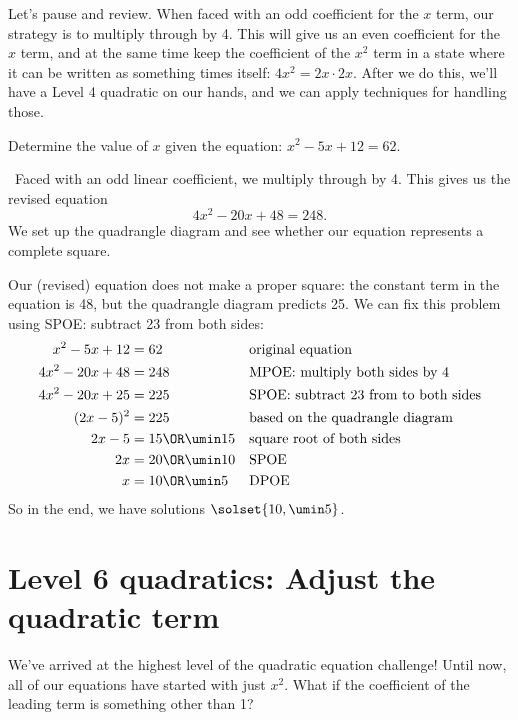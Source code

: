 Let's pause and review. When faced with an odd coefficient for the $x$ term, our strategy is to multiply through by 4. This will give us an even coefficient for the $x$ term, and at the same time keep the coefficient of the $x^2$ term in a state where it can be written as something times itself: $4x^2 = 2x\cdot2x$. After we do this, we'll have a Level 4 quadratic on our hands, and we can apply techniques for handling those.

\begin{boxedex}
Determine the value of $x$ given the equation: $x^2-5x+12=62$.

\exsoln\ Faced with an odd linear coefficient, we multiply through by 4. This gives us the revised equation \[4x^2-20x+48=248.\] We set up the quadrangle diagram and see whether our equation represents a complete square.


Our (revised) equation does not make a proper square: the constant term in the equation is 48, but the quadrangle diagram predicts 25. We can fix this problem using SPOE: subtract 23 from both sides:
\begin{align*}
x^2 - 5x + 12 &= 62
&&\text{original equation}
\\
4x^2 - 20x + 48 &= 248
&&\text{MPOE: multiply both sides by 4}
\\
4x^2 - 20x + 25 &= 225
&&\text{SPOE: subtract 23 from to both sides}
\\
(2x-5)^2 &= 225
&&\text{based on the quadrangle diagram}
\\
2x-5 &= 15 \OR \umin15
&&\text{square root of both sides}
\\
2x &= 20 \OR \umin10
&&\text{SPOE}
\\
x &= 10 \OR \umin5
&&\text{DPOE}
\end{align*}
So in the end, we have solutions $\solset{10, \umin5}$.
\end{boxedex}

\section{Level 6 quadratics: Adjust the quadratic term}

We've arrived at the highest level of the quadratic equation challenge! Until now, all of our equations have started with just $x^2$. What if the coefficient of the leading term is something other than 1?

